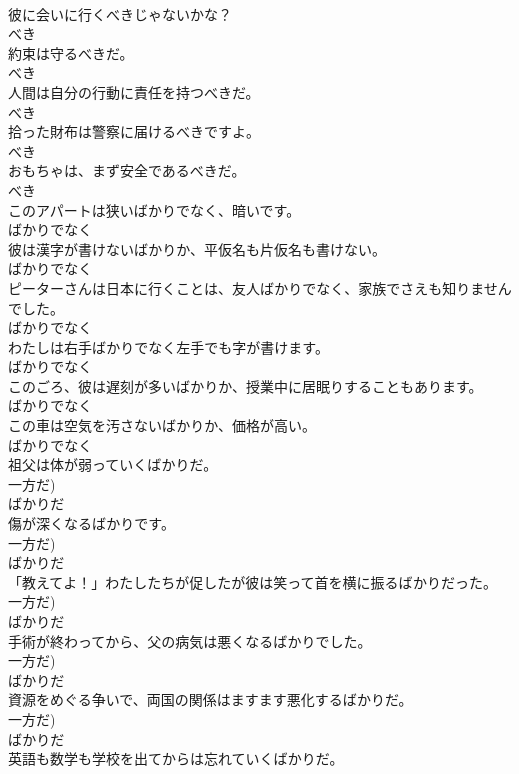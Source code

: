 \documentclass[8pt]{extreport}
\begin{document}
\begin{CJK}{UTF8}{min}
\\	彼に会いに行くべきじゃないかな？	
\\	べき
\\	約束は守るべきだ。	
\\	べき
\\	人間は自分の行動に責任を持つべきだ。	
\\	べき
\\	拾った財布は警察に届けるべきですよ。	
\\	べき
\\	おもちゃは、まず安全であるべきだ。	
\\	べき
\\	このアパートは狭いばかりでなく、暗いです。	
\\	ばかりでなく
\\	彼は漢字が書けないばかりか、平仮名も片仮名も書けない。	
\\	ばかりでなく
\\	ピーターさんは日本に行くことは、友人ばかりでなく、家族でさえも知りませんでした。	
\\	ばかりでなく
\\	わたしは右手ばかりでなく左手でも字が書けます。	
\\	ばかりでなく
\\	このごろ、彼は遅刻が多いばかりか、授業中に居眠りすることもあります。	
\\	ばかりでなく
\\	この車は空気を汚さないばかりか、価格が高い。	
\\	ばかりでなく
\\	祖父は体が弱っていくばかりだ。	
\\	一方だ)	
\\	ばかりだ
\\	傷が深くなるばかりです。	
\\	一方だ)	
\\	ばかりだ
\\	「教えてよ！」わたしたちが促したが彼は笑って首を横に振るばかりだった。	
\\	一方だ)	
\\	ばかりだ
\\	手術が終わってから、父の病気は悪くなるばかりでした。	
\\	一方だ)	
\\	ばかりだ
\\	資源をめぐる争いで、両国の関係はますます悪化するばかりだ。	
\\	一方だ)	
\\	ばかりだ
\\	英語も数学も学校を出てからは忘れていくばかりだ。	

\end{CJK}
\end{document}
